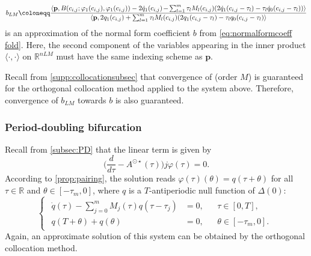 \documentclass[english]{myarticle}
\begin{document}
\begin{sloppypar}
\begin{equation*}
    b_{LM} \coloneqq \frac{\langle \mathbf{p}, B(c_{i,j};\varphi_1(c_{i,j}),\varphi_1(c_{i,j})) -  2\dot{q}_1(c_{i,j}) \hspace{-1pt} - \hspace{-1pt} \sum_{l=1}^m \tau_l M_l(c_{i,j}) (2\dot{q}_1(c_{i,j}-\tau_l)-\tau_l \dot{q}_0(c_{i,j}-\tau_l)) \rangle}{ \langle \mathbf{p}, 2{q}_1(c_{i,j}) + \sum_{l=1}^m \tau_l M_l(c_{i,j})(2{q}_1(c_{i,j}-\tau_l)-\tau_l {q}_0(c_{i,j}-\tau_l) \rangle}
\end{equation*}
is an approximation of the normal form coefficient $b$ from \eqref{eq:normalformcoeff fold}. Here, the second component of the variables appearing in the inner product $\langle \cdot , \cdot \rangle$ on $\mathbb{R}^{nLM}$ must have the same indexing scheme as $\mathbf{p}$.

Recall from \cref{supp:collocationsubsec} that convergence of (order $M$) is guaranteed for the orthogonal collocation method applied to the system above. Therefore, convergence of $b_{LM}$ towards $b$ is also guaranteed.

\subsubsection{Period-doubling bifurcation}
Recall from \cref{subsec:PD} that the linear term is given by
\begin{equation*}
    \bigg(\frac{d}{d \tau} - A^{\odot \star}(\tau) \bigg)j\varphi(\tau) = 0.
\end{equation*}
According to \cref{prop:pairing}, the solution reads $\varphi(\tau)(\theta) = q(\tau+\theta)$ for all $\tau \in \mathbb{R}$ and $\theta \in [-\tau_m,0]$, where $q$ is a $T$-antiperiodic null function of $\Delta(0)$:
\begin{equation*}
    \begin{cases}
    \begin{aligned}
    \dot{q}(\tau) - \textstyle\sum_{j=0}^m M_j(\tau)q(\tau-\tau_j) &= 0, &&\tau \in [0,T], \\
    q(T + \theta) + q(\theta) &= 0, &&\theta \in [-\tau_m,0].
    \end{aligned}
    \end{cases}
\end{equation*}
Again, an approximate solution of this system can be obtained by the orthogonal collocation method. 


\end{sloppypar}
\end{document}
